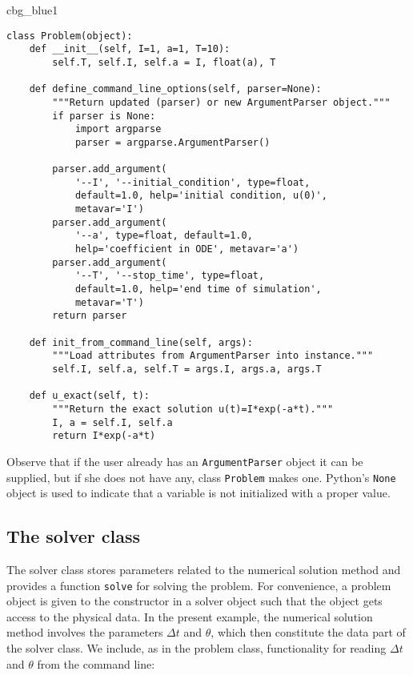 \documentclass[graybox,sectrefs,envcountresetchap,open=right,final]{svmonodo}
\newenvironment{_cod_tight}[1]{
   \def\FrameCommand{\colorbox{#1}}
   \FrameRule0.6pt\MakeFramed {\FrameRestore}\vskip3mm}
   {\vskip0mm\endMakeFramed}
\newenvironment{cod}[1]{
\bgroup\rmfamily
\fboxsep=0mm\relax
\begin{_cod_tight}{#1}
\list{}{\parsep=-2mm\parskip=0mm\topsep=0pt\leftmargin=2mm
\rightmargin=2\leftmargin\leftmargin=4pt\relax}
\item\relax}
{\endlist\end{_cod_tight}\egroup}
\begin{document}
\begin{cod}{cbg_blue1}\begin{Verbatim}[numbers=none,fontsize=\fontsize{9pt}{9pt},baselinestretch=0.95,xleftmargin=2mm]
class Problem(object):
    def __init__(self, I=1, a=1, T=10):
        self.T, self.I, self.a = I, float(a), T

    def define_command_line_options(self, parser=None):
        """Return updated (parser) or new ArgumentParser object."""
        if parser is None:
            import argparse
            parser = argparse.ArgumentParser()

        parser.add_argument(
            '--I', '--initial_condition', type=float,
            default=1.0, help='initial condition, u(0)',
            metavar='I')
        parser.add_argument(
            '--a', type=float, default=1.0,
            help='coefficient in ODE', metavar='a')
        parser.add_argument(
            '--T', '--stop_time', type=float,
            default=1.0, help='end time of simulation',
            metavar='T')
        return parser

    def init_from_command_line(self, args):
        """Load attributes from ArgumentParser into instance."""
        self.I, self.a, self.T = args.I, args.a, args.T

    def u_exact(self, t):
        """Return the exact solution u(t)=I*exp(-a*t)."""
        I, a = self.I, self.a
        return I*exp(-a*t)
\end{Verbatim}
\end{cod}
\noindent
Observe that if the user already has an \texttt{ArgumentParser} object it can be
supplied, but if she does not have any, class \texttt{Problem} makes one.
Python's \texttt{None} object is used to indicate that a variable is not
initialized with a proper value.

\subsection{The solver class}


The solver class stores parameters related to the numerical solution method
and provides a function \texttt{solve} for solving the problem.
For convenience, a problem object is given to the constructor
in a solver object such that the object gets access to the
physical data. In the present example,
the numerical solution method involves the parameters $\Delta t$
and $\theta$, which then constitute the data part of the solver class.
We include, as in the problem class, functionality for
reading $\Delta t$ and $\theta$ from the command line:
\end{document}
